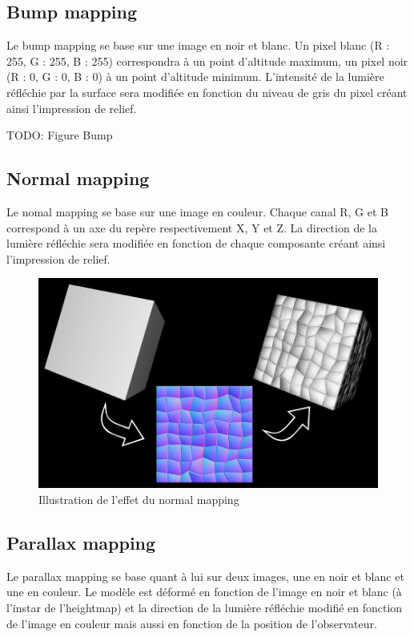 \documentclass[11pt]{report}
\begin{document}
\subsection{Bump mapping}

Le bump mapping se base sur une image en noir et blanc. Un pixel blanc (R : 255, G : 255, B : 255) correspondra à un point d’altitude maximum, un pixel noir (R : 0, G : 0, B : 0) à un point d’altitude minimum. L’intensité de la lumière réfléchie par la surface sera modifiée en fonction du niveau de gris du pixel créant ainsi l’impression de relief.

TODO: Figure Bump

\subsection{Normal mapping}

Le nomal mapping se base sur une image en couleur. Chaque canal R, G et B correspond à un axe du repère respectivement X, Y et Z. La direction de la lumière réfléchie sera modifiée en fonction de chaque composante créant ainsi l’impression de relief.

\begin{figure}[htbp]
\centering
\includegraphics[scale=0.30]{normal_mapping.jpg}
\caption{Illustration de l'effet du normal mapping}
\end{figure}

\subsection{Parallax mapping}

Le parallax mapping se base quant à lui sur deux images, une en noir et blanc et une en couleur. Le modèle est déformé en fonction de l’image en noir et blanc (à l’instar de l’heightmap) et la direction de la lumière réfléchie modifié en fonction de l’image en couleur mais aussi en fonction de la position de l’observateur.
\end{document}
